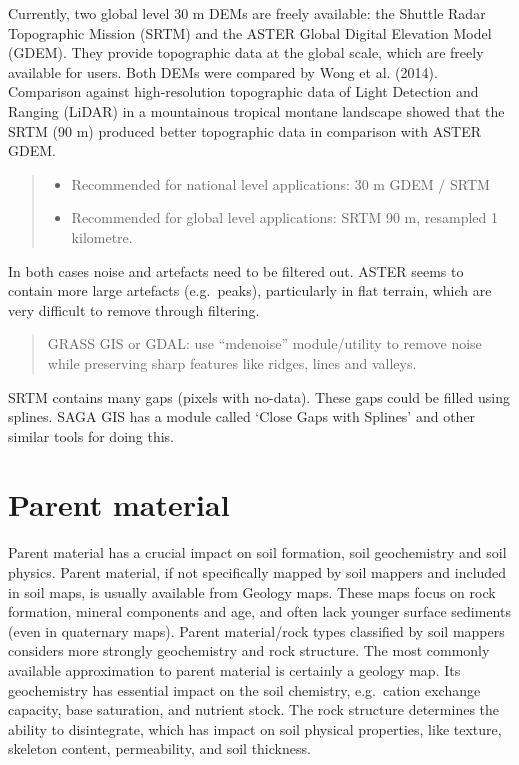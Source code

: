 \documentclass[]{book}
\providecommand{\tightlist}{%
  \setlength{\itemsep}{0pt}\setlength{\parskip}{0pt}}
\theoremstyle{definition}
\theoremstyle{definition}
\theoremstyle{definition}
\theoremstyle{remark}
\begin{document}
Currently, two global level 30 m DEMs are freely available: the Shuttle
Radar Topographic Mission (SRTM) and the ASTER Global Digital Elevation
Model (GDEM). They provide topographic data at the global scale, which
are freely available for users. Both DEMs were compared by Wong et al.
(2014). Comparison against high-resolution topographic data of Light
Detection and Ranging (LiDAR) in a mountainous tropical montane
landscape showed that the SRTM (90 m) produced better topographic data
in comparison with ASTER GDEM.

\begin{quote}
\begin{itemize}
\tightlist
\item
  Recommended for national level applications: 30 m GDEM / SRTM
\item
  Recommended for global level applications: SRTM 90 m, resampled 1
  kilometre.
\end{itemize}
\end{quote}

In both cases noise and artefacts need to be filtered out. ASTER seems
to contain more large artefacts (e.g.~peaks), particularly in flat
terrain, which are very difficult to remove through filtering.

\begin{quote}
GRASS GIS or GDAL: use ``mdenoise'' module/utility to remove noise while
preserving sharp features like ridges, lines and valleys.
\end{quote}

SRTM contains many gaps (pixels with no-data). These gaps could be
filled using splines. SAGA GIS has a module called `Close Gaps with
Splines' and other similar tools for doing this.

\section{Parent material}\label{parent-material}

Parent material has a crucial impact on soil formation, soil
geochemistry and soil physics. Parent material, if not specifically
mapped by soil mappers and included in soil maps, is usually available
from Geology maps. These maps focus on rock formation, mineral
components and age, and often lack younger surface sediments (even in
quaternary maps). Parent material/rock types classified by soil mappers
considers more strongly geochemistry and rock structure. The most
commonly available approximation to parent material is certainly a
geology map. Its geochemistry has essential impact on the soil
chemistry, e.g.~cation exchange capacity, base saturation, and nutrient
stock. The rock structure determines the ability to disintegrate, which
has impact on soil physical properties, like texture, skeleton content,
permeability, and soil thickness.
\end{document}
